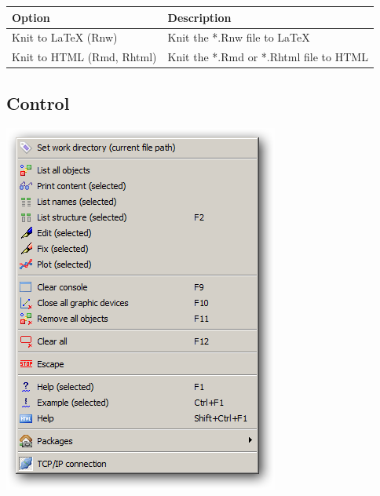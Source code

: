 \begin{scriptsize}\begin{tabularx}{\textwidth}{>{\hsize=0.3\hsize}X>{\hsize=0.7\hsize}X}\\
    \hline
    \textbf{Option} & \textbf{Description} \\
    \hline
    Knit to LaTeX (Rnw) & Knit the *.Rnw file to \LaTeX \\
    Knit to HTML (Rmd, Rhtml) & Knit the *.Rmd or *.Rhtml file to HTML\\
    \hline
  \end{tabularx}\end{scriptsize}


\hypertarget{menu_r_control}{}
\subsection{Control}

\includegraphics[scale=0.50]{./res/menu_r_control.png}\\

